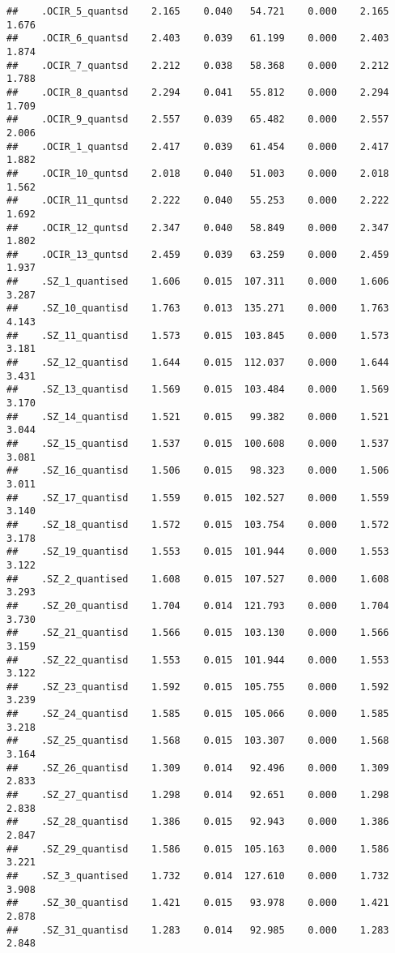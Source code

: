 \documentclass[]{article}
\begin{document}
\begin{verbatim}
##    .OCIR_5_quantsd    2.165    0.040   54.721    0.000    2.165    1.676
##    .OCIR_6_quantsd    2.403    0.039   61.199    0.000    2.403    1.874
##    .OCIR_7_quantsd    2.212    0.038   58.368    0.000    2.212    1.788
##    .OCIR_8_quantsd    2.294    0.041   55.812    0.000    2.294    1.709
##    .OCIR_9_quantsd    2.557    0.039   65.482    0.000    2.557    2.006
##    .OCIR_1_quantsd    2.417    0.039   61.454    0.000    2.417    1.882
##    .OCIR_10_quntsd    2.018    0.040   51.003    0.000    2.018    1.562
##    .OCIR_11_quntsd    2.222    0.040   55.253    0.000    2.222    1.692
##    .OCIR_12_quntsd    2.347    0.040   58.849    0.000    2.347    1.802
##    .OCIR_13_quntsd    2.459    0.039   63.259    0.000    2.459    1.937
##    .SZ_1_quantised    1.606    0.015  107.311    0.000    1.606    3.287
##    .SZ_10_quantisd    1.763    0.013  135.271    0.000    1.763    4.143
##    .SZ_11_quantisd    1.573    0.015  103.845    0.000    1.573    3.181
##    .SZ_12_quantisd    1.644    0.015  112.037    0.000    1.644    3.431
##    .SZ_13_quantisd    1.569    0.015  103.484    0.000    1.569    3.170
##    .SZ_14_quantisd    1.521    0.015   99.382    0.000    1.521    3.044
##    .SZ_15_quantisd    1.537    0.015  100.608    0.000    1.537    3.081
##    .SZ_16_quantisd    1.506    0.015   98.323    0.000    1.506    3.011
##    .SZ_17_quantisd    1.559    0.015  102.527    0.000    1.559    3.140
##    .SZ_18_quantisd    1.572    0.015  103.754    0.000    1.572    3.178
##    .SZ_19_quantisd    1.553    0.015  101.944    0.000    1.553    3.122
##    .SZ_2_quantised    1.608    0.015  107.527    0.000    1.608    3.293
##    .SZ_20_quantisd    1.704    0.014  121.793    0.000    1.704    3.730
##    .SZ_21_quantisd    1.566    0.015  103.130    0.000    1.566    3.159
##    .SZ_22_quantisd    1.553    0.015  101.944    0.000    1.553    3.122
##    .SZ_23_quantisd    1.592    0.015  105.755    0.000    1.592    3.239
##    .SZ_24_quantisd    1.585    0.015  105.066    0.000    1.585    3.218
##    .SZ_25_quantisd    1.568    0.015  103.307    0.000    1.568    3.164
##    .SZ_26_quantisd    1.309    0.014   92.496    0.000    1.309    2.833
##    .SZ_27_quantisd    1.298    0.014   92.651    0.000    1.298    2.838
##    .SZ_28_quantisd    1.386    0.015   92.943    0.000    1.386    2.847
##    .SZ_29_quantisd    1.586    0.015  105.163    0.000    1.586    3.221
##    .SZ_3_quantised    1.732    0.014  127.610    0.000    1.732    3.908
##    .SZ_30_quantisd    1.421    0.015   93.978    0.000    1.421    2.878
##    .SZ_31_quantisd    1.283    0.014   92.985    0.000    1.283    2.848

\end{verbatim}
\end{document}
